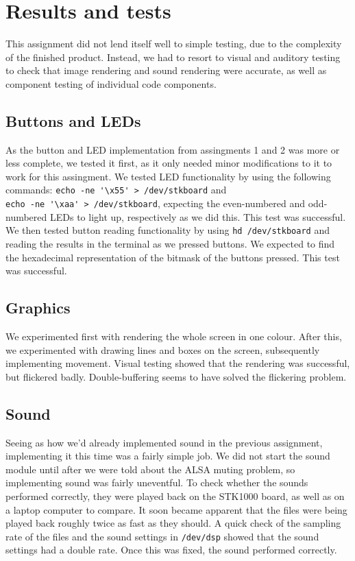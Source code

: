 \section{Results and tests}
This assignment did not lend itself well to simple testing, due to the
complexity of the finished product. Instead, we had to resort to visual
and auditory testing to check that image rendering and sound rendering
were accurate, as well as component testing of individual code
components.

\subsection{Buttons and LEDs}
As the button and LED implementation from assingments 1 and 2 was more
or less complete, we tested it first, as it only needed minor
modifications to it to work for this assingment.  We tested LED
functionality by using the following commands: 
\verb|echo -ne '\x55' > /dev/stkboard| and \\
\verb|echo -ne '\xaa' > /dev/stkboard|,
expecting the even-numbered and odd-numbered LEDs to light up,
respectively as we did this. This test was successful.  We then tested
button reading functionality by using \texttt{hd /dev/stkboard} and
reading the results in the terminal as we pressed buttons. We expected
to find the hexadecimal representation of the bitmask of the buttons
pressed. This test was successful.

\subsection{Graphics}
We experimented first with rendering the whole screen in one colour.
After this, we experimented with drawing lines and boxes on the screen,
subsequently implementing movement. Visual testing showed that the
rendering was successful, but flickered badly.  Double-buffering seems
to have solved the flickering problem. %

\subsection{Sound}
Seeing as how we'd already implemented sound in the previous assignment, implementing it this time was a fairly simple job. We did not start the sound module until after we were told about the ALSA muting problem, so implementing sound was fairly uneventful. To check whether the sounds performed correctly, they were played back on the STK1000 board, as well as on a laptop computer to compare. It soon became apparent that the files were being played back roughly twice as fast as they should. A quick check of the sampling rate of the files and the sound settings in \texttt{/dev/dsp} showed that the sound settings had a double rate. Once this was fixed, the sound performed correctly.

